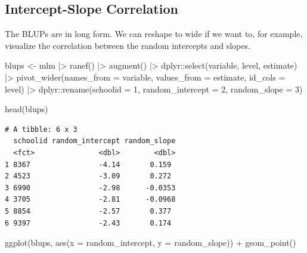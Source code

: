 \documentclass[
  letterpaper,
  DIV=11,
  numbers=noendperiod]{scrreprt}
\newenvironment{Shaded}{}{}
\newcommand{\AttributeTok}[1]{\textcolor[rgb]{0.49,0.56,0.16}{#1}}
\newcommand{\DecValTok}[1]{\textcolor[rgb]{0.25,0.63,0.44}{#1}}
\newcommand{\FunctionTok}[1]{\textcolor[rgb]{0.02,0.16,0.49}{#1}}
\newcommand{\NormalTok}[1]{#1}
\newcommand{\OtherTok}[1]{\textcolor[rgb]{0.00,0.44,0.13}{#1}}
\newcommand{\SpecialCharTok}[1]{\textcolor[rgb]{0.25,0.44,0.63}{#1}}
\begin{document}
\subsection{Intercept-Slope
Correlation}\label{intercept-slope-correlation}

The BLUPs are in long form. We can reshape to wide if we want to, for
example, visualize the correlation between the random intercepts and
slopes.

\begin{Shaded}
\begin{Highlighting}[]
\NormalTok{blups }\OtherTok{\textless{}{-}}\NormalTok{ mlm }\SpecialCharTok{|\textgreater{}} 
  \FunctionTok{ranef}\NormalTok{() }\SpecialCharTok{|\textgreater{}} 
  \FunctionTok{augment}\NormalTok{() }\SpecialCharTok{|\textgreater{}} 
\NormalTok{  dplyr}\SpecialCharTok{::}\FunctionTok{select}\NormalTok{(variable, level, estimate) }\SpecialCharTok{|\textgreater{}} 
  \FunctionTok{pivot\_wider}\NormalTok{(}\AttributeTok{names\_from =}\NormalTok{ variable, }\AttributeTok{values\_from =}\NormalTok{ estimate,}
              \AttributeTok{id\_cols =}\NormalTok{ level) }\SpecialCharTok{|\textgreater{}} 
\NormalTok{  dplyr}\SpecialCharTok{::}\FunctionTok{rename}\NormalTok{(}\AttributeTok{schoolid =} \DecValTok{1}\NormalTok{, }\AttributeTok{random\_intercept =} \DecValTok{2}\NormalTok{, }\AttributeTok{random\_slope =} \DecValTok{3}\NormalTok{)}

\FunctionTok{head}\NormalTok{(blups)}
\end{Highlighting}
\end{Shaded}

\begin{verbatim}
# A tibble: 6 x 3
  schoolid random_intercept random_slope
  <fct>               <dbl>        <dbl>
1 8367                -4.14       0.159 
2 4523                -3.09       0.272 
3 6990                -2.98      -0.0353
4 3705                -2.81      -0.0968
5 8854                -2.57       0.377 
6 9397                -2.43       0.174 
\end{verbatim}

\begin{Shaded}
\begin{Highlighting}[]
\FunctionTok{ggplot}\NormalTok{(blups, }\FunctionTok{aes}\NormalTok{(}\AttributeTok{x =}\NormalTok{ random\_intercept, }\AttributeTok{y =}\NormalTok{ random\_slope)) }\SpecialCharTok{+}
  \FunctionTok{geom\_point}\NormalTok{()}
\end{Highlighting}
\end{Shaded}
\end{document}
